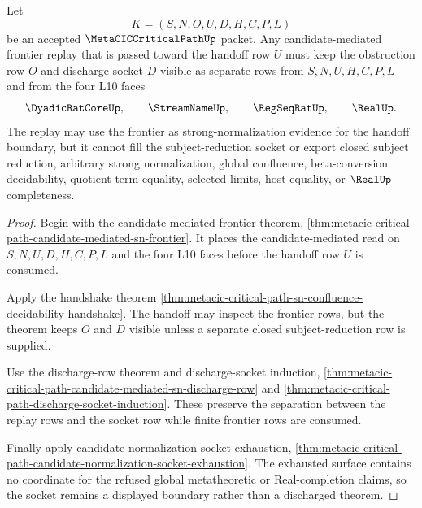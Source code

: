 \begin{theorem}
\label{thm:metacic-critical-path-candidate-mediated-frontier-socket-separation}
Let
$$
K=(S,N,O,U,D,H,C,P,L)
$$
be an accepted $\MetaCICCriticalPathUp$ packet. Any candidate-mediated frontier replay that is passed toward the handoff row $U$ must keep the obstruction row $O$ and discharge socket $D$ visible as separate rows from $S,N,U,H,C,P,L$ and from the four L10 faces
$$
\DyadicRatCoreUp,\qquad
\StreamNameUp,\qquad
\RegSeqRatUp,\qquad
\RealUp .
$$
The replay may use the frontier as strong-normalization evidence for the handoff boundary, but it cannot fill the subject-reduction socket or export closed subject reduction, arbitrary strong normalization, global confluence, beta-conversion decidability, quotient term equality, selected limits, host equality, or $\RealUp$ completeness.
\end{theorem}
\begin{proof}
Begin with the candidate-mediated frontier theorem, \autoref{thm:metacic-critical-path-candidate-mediated-sn-frontier}. It places the candidate-mediated read on $S,N,U,D,H,C,P,L$ and the four L10 faces before the handoff row $U$ is consumed.

Apply the handshake theorem \autoref{thm:metacic-critical-path-sn-confluence-decidability-handshake}. The handoff may inspect the frontier rows, but the theorem keeps $O$ and $D$ visible unless a separate closed subject-reduction row is supplied.

Use the discharge-row theorem and discharge-socket induction, \autoref{thm:metacic-critical-path-candidate-mediated-sn-discharge-row} and \autoref{thm:metacic-critical-path-discharge-socket-induction}. These preserve the separation between the replay rows and the socket row while finite frontier rows are consumed.

Finally apply candidate-normalization socket exhaustion, \autoref{thm:metacic-critical-path-candidate-normalization-socket-exhaustion}. The exhausted surface contains no coordinate for the refused global metatheoretic or Real-completion claims, so the socket remains a displayed boundary rather than a discharged theorem.
\end{proof}

